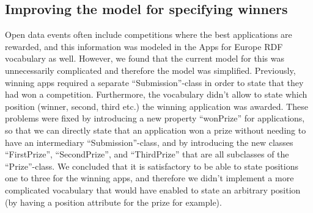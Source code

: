 \begin{figure}[!htbp]
\end{figure}

\subsection{Improving the model for specifying winners}
Open data events often include competitions where the best applications are rewarded, and this information was modeled in the Apps for Europe RDF vocabulary as well. However, we found that the current model for this was unnecessarily complicated and therefore the model was simplified. Previously, winning apps required a separate ``Submission''-class in order to state that they had won a competition. Furthermore, the vocabulary didn't allow to state which position (winner, second, third etc.) the winning application was awarded. These problems were fixed by introducing a new property ``wonPrize'' for applications, so that we can directly state that an application won a prize without needing to have an intermediary ``Submission''-class, and by introducing the new classes ``FirstPrize'', ``SecondPrize'', and ``ThirdPrize'' that are all subclasses of the ``Prize''-class. We concluded that it is satisfactory to be able to state positions one to three for the winning apps, and therefore we didn't implement a more complicated vocabulary that would have enabled to state an arbitrary position (by having a position attribute for the prize for example).

